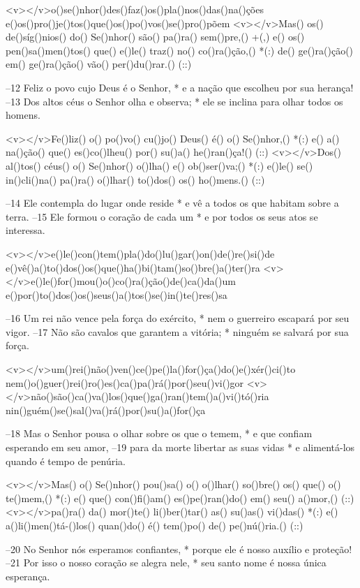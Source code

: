<v></v>o()se()nhor()des()faz()os()pla()nos()das()na()ções
e()os()pro()je()tos()que()os()po()vos()se()pro()põem
<v></v>Mas() os() de()síg()nios() do() Se()nhor() são() pa()ra() sem()pre,() +(,)
e() os() pen()sa()men()tos() que() e()le() traz() no() co()ra()ção,() *(:)
de() ge()ra()ção() em() ge()ra()ção() vão() per()du()rar.() (::)

–12 Feliz o povo cujo Deus é o Senhor, *
e a nação que escolheu por sua herança!
–13 Dos altos céus o Senhor olha e observa; *
ele se inclina para olhar todos os homens.

<v></v>Fe()liz() o() po()vo() cu()jo() Deus() é() o() Se()nhor,() *(:)
e() a() na()ção() que() es()co()lheu() por() su()a() he()ran()ça!() (::)
<v></v>Dos() al()tos() céus() o() Se()nhor() o()lha() e() ob()ser()va;() *(:)
e()le() se() in()cli()na() pa()ra() o()lhar() to()dos() os() ho()mens.() (::)

–14 Ele contempla do lugar onde reside *
e vê a todos os que habitam sobre a terra.
–15 Ele formou o coração de cada um *
e por todos os seus atos se interessa.

<v></v>e()le()con()tem()pla()do()lu()gar()on()de()re()si()de
e()vê()a()to()dos()os()que()ha()bi()tam()so()bre()a()ter()ra
<v></v>e()le()for()mou()o()co()ra()ção()de()ca()da()um
e()por()to()dos()os()seus()a()tos()se()in()te()res()sa

–16 Um rei não vence pela força do exército, *
nem o guerreiro escapará por seu vigor.
–17 Não são cavalos que garantem a vitória; *
ninguém se salvará por sua força.

<v></v>um()rei()não()ven()ce()pe()la()for()ça()do()e()xér()ci()to
nem()o()guer()rei()ro()es()ca()pa()rá()por()seu()vi()gor
<v></v>não()são()ca()va()los()que()ga()ran()tem()a()vi()tó()ria
nin()guém()se()sal()va()rá()por()su()a()for()ça

–18 Mas o Senhor pousa o olhar sobre os que o temem, *
e que confiam esperando em seu amor,
–19 para da morte libertar as suas vidas *
e alimentá-los quando é tempo de penúria.

<v></v>Mas() o() Se()nhor() pou()sa() o() o()lhar() so()bre() os() que() o() te()mem,() *(:)
e() que() con()fi()am() es()pe()ran()do() em() seu() a()mor,() (::)
<v></v>pa()ra() da() mor()te() li()ber()tar() as() su()as() vi()das() *(:)
e() a()li()men()tá-()los() quan()do() é() tem()po() de() pe()nú()ria.() (::)

–20 No Senhor nós esperamos confiantes, *
porque ele é nosso auxílio e proteção!
–21 Por isso o nosso coração se alegra nele, *
seu santo nome é nossa única esperança.

